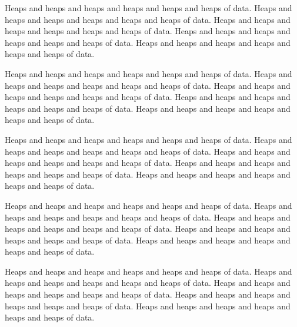 Heaps and heaps and heaps and heaps and heaps and heaps of data.
Heaps and heaps and heaps and heaps and heaps and heaps of data.
Heaps and heaps and heaps and heaps and heaps and heaps of data.
Heaps and heaps and heaps and heaps and heaps and heaps of data.
Heaps and heaps and heaps and heaps and heaps and heaps of data.

Heaps and heaps and heaps and heaps and heaps and heaps of data.
Heaps and heaps and heaps and heaps and heaps and heaps of data.
Heaps and heaps and heaps and heaps and heaps and heaps of data.
Heaps and heaps and heaps and heaps and heaps and heaps of data.
Heaps and heaps and heaps and heaps and heaps and heaps of data.

Heaps and heaps and heaps and heaps and heaps and heaps of data.
Heaps and heaps and heaps and heaps and heaps and heaps of data.
Heaps and heaps and heaps and heaps and heaps and heaps of data.
Heaps and heaps and heaps and heaps and heaps and heaps of data.
Heaps and heaps and heaps and heaps and heaps and heaps of data.

Heaps and heaps and heaps and heaps and heaps and heaps of data.
Heaps and heaps and heaps and heaps and heaps and heaps of data.
Heaps and heaps and heaps and heaps and heaps and heaps of data.
Heaps and heaps and heaps and heaps and heaps and heaps of data.
Heaps and heaps and heaps and heaps and heaps and heaps of data.

Heaps and heaps and heaps and heaps and heaps and heaps of data.
Heaps and heaps and heaps and heaps and heaps and heaps of data.
Heaps and heaps and heaps and heaps and heaps and heaps of data.
Heaps and heaps and heaps and heaps and heaps and heaps of data.
Heaps and heaps and heaps and heaps and heaps and heaps of data.

